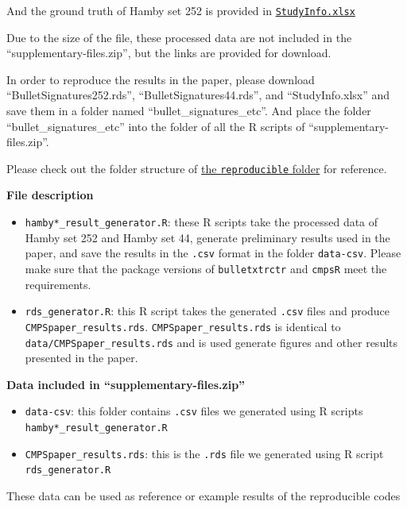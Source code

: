 And the ground truth of Hamby set 252 is provided in
\href{https://github.com/willju-wangqian/CMPSpaper/blob/main/reproducible/bullet_signatures_etc/StudyInfo.xlsx}{\texttt{StudyInfo.xlsx}}

Due to the size of the file, these processed data are not included in
the ``supplementary-files.zip'', but the links are provided for
download.

In order to reproduce the results in the paper, please download
``BulletSignatures252.rds'', ``BulletSignatures44.rds'', and
``StudyInfo.xlsx'' and save them in a folder named
``bullet\_signatures\_etc''. And place the folder
``bullet\_signatures\_etc'' into the folder of all the R scripts of
``supplementary-files.zip''.

Please check out the folder structure of
\href{https://github.com/willju-wangqian/CMPSpaper/tree/main/reproducible}{the
\texttt{reproducible} folder} for reference.

\textbf{File description}

\begin{itemize}
\tightlist
\item
  \texttt{hamby*\_result\_generator.R}: these R scripts take the
  processed data of Hamby set 252 and Hamby set 44, generate preliminary
  results used in the paper, and save the results in the \texttt{.csv}
  format in the folder \texttt{data-csv}. Please make sure that the
  package versions of \texttt{bulletxtrctr} and \texttt{cmpsR} meet the
  requirements.
\item
  \texttt{rds\_generator.R}: this R script takes the generated
  \texttt{.csv} files and produce \texttt{CMPSpaper\_results.rds}.
  \texttt{CMPSpaper\_results.rds} is identical to
  \texttt{data/CMPSpaper\_results.rds} and is used generate figures and
  other results presented in the paper.
\end{itemize}

\textbf{Data included in ``supplementary-files.zip''}

\begin{itemize}
\tightlist
\item
  \texttt{data-csv}: this folder contains \texttt{.csv} files we
  generated using R scripts \texttt{hamby*\_result\_generator.R}
\item
  \texttt{CMPSpaper\_results.rds}: this is the \texttt{.rds} file we
  generated using R script \texttt{rds\_generator.R}
\end{itemize}

These data can be used as reference or example results of the
reproducible codes

